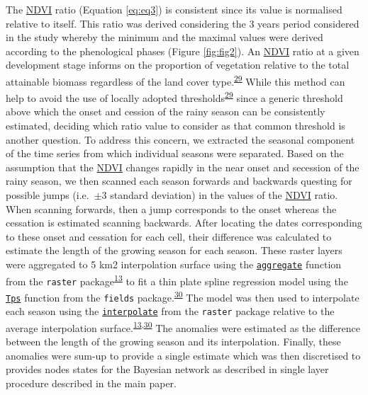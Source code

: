 \documentclass[12pt,oneside]{article}
\begin{document}
The \href{https://www.sciencedirect.com/science/article/pii/0034425779900130?via\%3Dihub}{NDVI} ratio (Equation \eqref{eq:eq3}) is consistent since its value is normalised relative to itself. This ratio was derived considering the 3 years period considered in the study whereby the minimum and the maximal values were derived according to the phenological phases (Figure \ref{fig:fig2}). An \href{https://www.sciencedirect.com/science/article/pii/0034425779900130?via\%3Dihub}{NDVI} ratio at a given development stage informs on the proportion of vegetation relative to the total attainable biomass regardless of the land cover type.\textsuperscript{\protect\hyperlink{ref-White_et_al_1997}{29}} While this method can help to avoid the use of locally adopted thresholds\textsuperscript{\protect\hyperlink{ref-White_et_al_1997}{29}} since a generic threshold above which the onset and cession of the rainy season can be consistently estimated, deciding which ratio value to consider as that common threshold is another question. To address this concern, we extracted the seasonal component of the time series from which individual seasons were separated. Based on the assumption that the \href{https://www.sciencedirect.com/science/article/pii/0034425779900130?via\%3Dihub}{NDVI} changes rapidly in the near onset and secession of the rainy season, we then scanned each season forwards and backwards questing for possible jumps (i.e.~\(\pm 3\) standard deviation) in the values of the \href{https://www.sciencedirect.com/science/article/pii/0034425779900130?via\%3Dihub}{NDVI} ratio. When scanning forwards, then a jump corresponds to the onset whereas the cessation is estimated scanning backwards. After locating the dates corresponding to these onset and cessation for each cell, their difference was calculated to estimate the length of the growing season for each season. These raster layers were aggregated to 5 km2 interpolation surface using the \href{https://www.rdocumentation.org/packages/raster/versions/2.8-19/topics/aggregate}{\texttt{aggregate}} function from the \texttt{raster} package\textsuperscript{\protect\hyperlink{ref-Hijmans_2019}{13}} to fit a thin plate spline regression model using the \href{https://www.rdocumentation.org/packages/fields/versions/9.6/topics/Tps}{\texttt{Tps}} function from the \texttt{fields} package.\textsuperscript{\protect\hyperlink{ref-Nychka_et_al_2018}{30}} The model was then used to interpolate each season using the \href{https://www.rdocumentation.org/packages/raster/versions/2.8-19/topics/interpolate}{\texttt{interpolate}} from the \texttt{raster} package relative to the average interpolation surface.\textsuperscript{\protect\hyperlink{ref-Hijmans_2019}{13},\protect\hyperlink{ref-Nychka_et_al_2018}{30}} The anomalies were estimated as the difference between the length of the growing season and its interpolation. Finally, these anomalies were sum-up to provide a single estimate which was then discretised to provides nodes states for the Bayesian network as described in single layer procedure described in the main paper.
\end{document}
